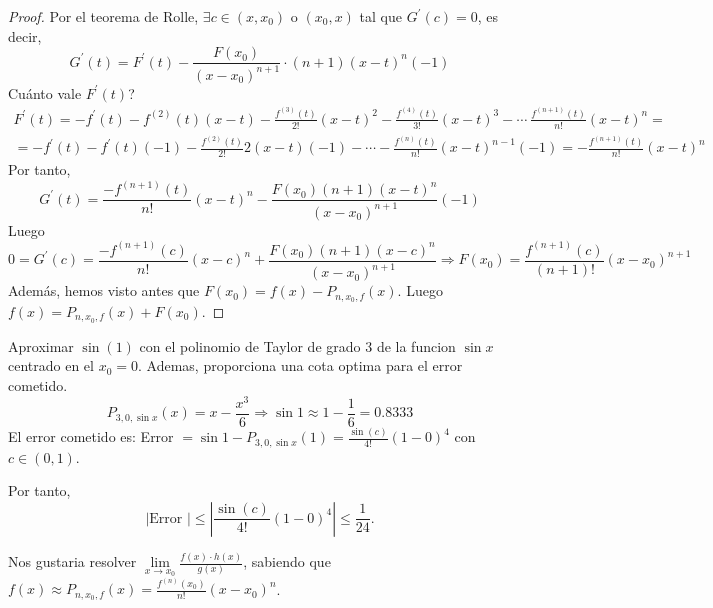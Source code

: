 \begin{proof}
	Por el teorema de Rolle, \(\exists c \in (x, x_0 )\) o \((x_0, x )\) tal que \(G^\prime (c) = 0 \), es decir,
	\[
		G^\prime (t) = F^\prime (t) - \frac{F(x_0 )}{(x - x_0)^{n + 1} } \cdot (n + 1) (x - t)^{n} (-1)
	\]
	Cuánto vale \(F^\prime (t )\)?
	\begin{multline*}
		F^\prime (t) = - f^\prime (t) - f^{(2)}  (t)(x - t) - \frac{f^{(3)} (t) }{2!}(x - t)^{2} - \frac{f^{(4)}(t)}{3!} (x - t)^{3} - \cdots \ \frac{f^{(n + 1)}(t) }{n!} (x - t)^{n} = \\ = -f^\prime (t) - f^\prime (t)(-1) - \frac{f^{(2)}(t) }{2!} 2 (x - t)(-1) - \cdots - \frac{f^{(n)} (t)}{n!}(x - t)^{n - 1}(-1) = - \frac{f^{(n + 1)} (t) }{n!}(x - t)^{n}
	\end{multline*}
	Por tanto,
	\[
		G^\prime (t) = \frac{-f^{(n + 1)}(t) }{n!}(x - t)^{n} - \frac{F(x_0)(n + 1)(x - t)^{n} }{(x - x_0)^{n + 1}}(-1)
	\]
	Luego
	\[
		0 = G^\prime (c) = \frac{-f^{(n+1)}(c) }{n!}(x - c)^{n} + \frac{F(x_0)(n + 1)(x - c)^{n} }{(x - x_0)^{n + 1} } \Rightarrow F(x_0) = \frac{f^{(n + 1)}(c) }{(n+1)!}(x -x_0)^{n + 1}
	\]
	Además, hemos visto antes que \(F(x_0) = f(x) - P_{n,x_0,f}(x )\). Luego \(f(x) = P_{n,x_0, f}(x) + F(x_0 )\).
\end{proof}

\begin{example}
	Aproximar \(\sin (1 )\) con el polinomio de Taylor de grado \(3 \) de la funcion \(\sin x \) centrado en el \(x_0 = 0 \). Ademas, proporciona una cota optima para el error cometido.
	\[
		P_{3,0,\sin x}(x) = x - \frac{x^{3} }{6} \Rightarrow \sin 1 \approx 1 - \frac{1}{6} = 0.8333
	\]
	El error cometido es: Error \(= \sin 1 - P_{3,0,\sin x}(1) = \frac{\sin (c)}{4!}(1 - 0)^{4}  \) con \(c \in (0,1 )\).
	
	Por tanto,
	\[
		\left\vert \text{Error }  \right\vert \leq \left\vert \frac{\sin (c)}{4!} (1 - 0)^{4}  \right\vert \leq \frac{1}{24}.
	\]
\end{example}

Nos gustaria resolver \(\lim\limits_{x  \to x_0 } \frac{f(x) \cdot h(x )}{g(x )}\), sabiendo que \(f(x) \approx P_{n,x_0,f}(x) = \frac{f^{(n)}(x_0) }{n!} (x - x_0)^{n} \).

